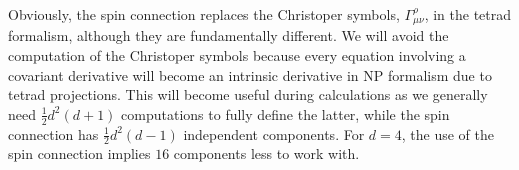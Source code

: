 Obviously, the spin connection replaces the Christoper symbols, $\Gamma^\rho_{\mu\nu}$, in the tetrad formalism, although they are fundamentally different.
We will avoid the computation of the Christoper symbols because every equation involving a covariant derivative will become an intrinsic derivative in NP formalism due to tetrad projections. 
This will become useful during calculations as we generally need $\tfrac{1}{2} d^2(d+1)$ computations to fully define the latter, while the spin connection has $\tfrac{1}{2} d^2(d-1)$ independent components.
For $d=4$, the use of the spin connection implies $16$ components less to work with.